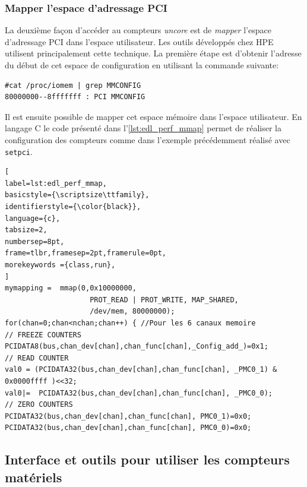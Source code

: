     \subsubsection{Mapper l'espace d'adressage PCI}
    La deuxième façon d'accéder au compteurs \textit{uncore} est de \textit{mapper} l'espace d'adressage PCI dans l'espace utilisateur. Les outils développés chez HPE utilisent principalement cette technique. La première étape est d'obtenir l'adresse du début de cet espace de configuration en utilisant la commande suivante:
\begin{verbatim}
#cat /proc/iomem | grep MMCONFIG  
80000000--8fffffff : PCI MMCONFIG
\end{verbatim}
    Il est ensuite possible de mapper cet espace mémoire dans l'espace utilisateur. En langage C le code présenté dans l'\autoref{lst:edl_perf_mmap} permet de réaliser la configuration des compteurs comme dans l'exemple précédemment réalisé avec \verb|setpci|.
    \begin{lstlisting}[
label=lst:edl_perf_mmap,
basicstyle={\scriptsize\ttfamily},
identifierstyle={\color{black}},
language={c},
tabsize=2,
numbersep=8pt,
frame=tlbr,framesep=2pt,framerule=0pt,
morekeywords ={class,run},
]
mymapping =  mmap(0,0x10000000, 
		            PROT_READ | PROT_WRITE, MAP_SHARED, 		 
		            /dev/mem, 80000000);
for(chan=0;chan<nchan;chan++) { //Pour les 6 canaux memoire 
// FREEZE COUNTERS 
PCIDATA8(bus,chan_dev[chan],chan_func[chan],_Config_add_)=0x1; 
// READ COUNTER 
val0 = (PCIDATA32(bus,chan_dev[chan],chan_func[chan], _PMC0_1) & 0x0000ffff )<<32; 
val0|=  PCIDATA32(bus,chan_dev[chan],chan_func[chan], _PMC0_0); 
// ZERO COUNTERS 
PCIDATA32(bus,chan_dev[chan],chan_func[chan], PMC0_1)=0x0;
PCIDATA32(bus,chan_dev[chan],chan_func[chan], PMC0_0)=0x0;
\end{lstlisting}
    
    
    
    
    \subsection{Interface et outils pour utiliser les compteurs matériels}\label{sec:edl_monitoring_tools}
    
